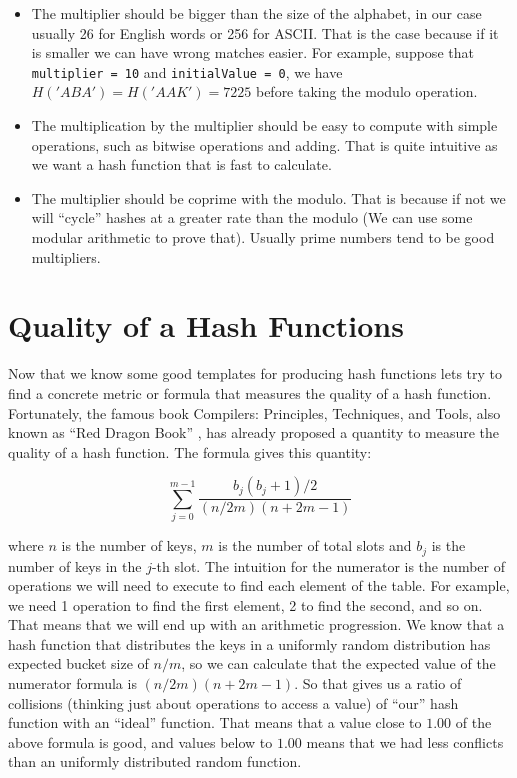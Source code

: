 \begin{itemize}
\item The multiplier should be bigger than the size of the alphabet, in our case usually 26 for English words or 256 for ASCII. That is the case because if it is smaller we can have wrong matches easier. For example, suppose that \texttt{multiplier = 10} and \texttt{initialValue = 0}, we have \( H('ABA') = H('AAK') = 7225 \) before taking the modulo operation.

\item The multiplication by the multiplier should be easy to compute with simple operations, such as bitwise operations and adding. That is quite intuitive as we want a hash function that is fast to calculate. 

\item The multiplier should be coprime with the modulo. That is because if not we will ``cycle'' hashes at a greater rate than the modulo (We can use some modular arithmetic to prove that). Usually prime numbers tend to be good multipliers.
\end{itemize}

\section{Quality of a Hash Functions}

Now that we know some good templates for producing hash functions lets try to find a concrete metric or formula that measures the quality of a hash function. Fortunately, the famous book Compilers: Principles, Techniques, and Tools, also known as ``Red Dragon Book'' \citep{DragonBook}, has already proposed a quantity to measure the quality of a hash function. The formula gives this quantity:

\[ \sum_{j = 0}^{m - 1} \frac{b_j(b_j + 1)/2}{ (n/2m)(n + 2m - 1) } \]

where \( n \) is the number of keys, \( m \) is the number of total slots and \( b_j \) is the number of keys in the \( j \)-th slot. The intuition for the numerator is the number of operations we will need to execute to find each element of the table. For example, we need 1 operation to find the first element, 2 to find the second, and so on. That means that we will end up with an arithmetic progression. We know that a hash function that distributes the keys in a uniformly random distribution has expected bucket size of \( n / m \), so we can calculate that the expected value of the numerator formula is \( (n/2m)(n + 2m - 1) \). So that gives us a ratio of collisions (thinking just about operations to access a value) of ``our'' hash function with an ``ideal'' function. That means that a value close to \( 1.00 \) of the above formula is good, and values below to \( 1.00 \) means that we had less conflicts than an uniformly distributed random function.

